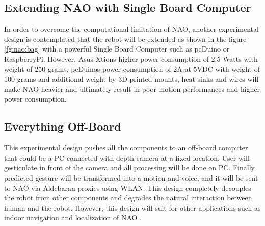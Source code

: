 \subsection*{Extending NAO with Single Board Computer} In order to overcome the computational limitation of NAO, another experimental design is contemplated that the robot will be extended as shown in the figure \ref{fg:nao:bag} with a powerful Single Board Computer such as pcDuino or RaspberryPi. However, Asus Xtions higher power consumption of 2.5 Watts with weight of 250 grams, pcDuinos power consumption of 2A at 5VDC with weight of 100 grams and additional weight by 3D printed mounts, heat sinks and wires will make NAO heavier and ultimately result in poor motion performances and higher power consumption. 



\subsection*{Everything Off-Board} This experimental design pushes all the components to an off-board computer that could be a PC connected with depth camera at a fixed location. User will gesticulate in front of the camera and all processing will be done on PC. Finally predicted gesture will be transformed into a motion and voice, and it will be sent to NAO via Aldebaran proxies using WLAN. This design completely decouples the robot from other components and degrades the natural interaction between human and the robot. However, this design will suit for other applications such as indoor navigation and localization of NAO \cite{20}.

